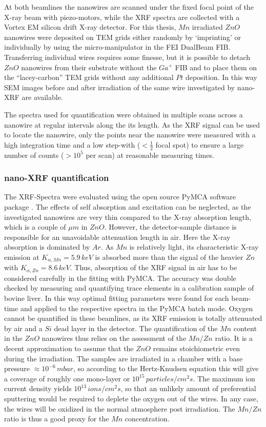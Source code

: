 At both beamlines the nanowires are scanned under the fixed focal point of the X-ray beam with piezo-motors, while the XRF spectra are collected with a Vortex EM silicon drift X-ray detector. For this thesis, $Mn$ irradiated $ZnO$ nanowires were deposited on TEM grids either randomly by `imprinting' or individually by using the micro-manipulator in the FEI DualBeam FIB. Transferring individual wires requires some finesse, but it is possible to detach $ZnO$ nanowires from their substrate without the $Ga^+$ FIB and to place them on the ``lacey-carbon'' TEM grids without any additional $Pt$ deposition. In this way SEM images before and after irradiation of the same wire investigated by nano-XRF are available.

The spectra used for quantification were obtained in multiple scans across a nanowire at regular intervals along the its length. As the XRF signal can be used to locate the nanowire, only the points near the nanowire were measured with a high integration time and a low step-with ($< \frac{1}{2}$ focal spot) to ensure a large number of counts ($> 10^5$ per scan) at reasonable measuring times.

\subsubsection{nano-XRF quantification}

The XRF-Spectra were evaluated using the open source PyMCA software package \cite{sole_multiplatform_2007}. The effects of self absorption and excitation can be neglected, as the investigated nanowires are very thin compared to the X-ray absorption length, which is a couple of $\mu m$ in $ZnO$. However, the detector-sample distance is responsible for an unavoidable attenuation length in air. Here the X-ray absorption is dominated by $Ar$. As $Mn$ is relatively light, its characteristic X-ray emission at $K_{\alpha,Mn} = 5.9\,keV$ is absorbed more than the signal of the heavier $Zn$ with $K_{\alpha,Zn} = 8.6\,keV$. Thus, absorption of the XRF signal in air has to be considered carefully in the fitting with PyMCA. The accuracy was double checked by measuring and quantifying trace elements in a calibration sample of bovine liver. In this way optimal fitting parameters were found for each beam-time and applied to the respective spectra in the PyMCA batch mode. Oxygen cannot be quantified in these beamlines, as its XRF emission is totally attenuated by air and a $Si$ dead layer in the detector. The quantification of the $Mn$ content in the $ZnO$ nanowires thus relies on the assessment of the $Mn/Zn$ ratio. It is a decent approximation to assume that the $ZnO$ remains stoichiometric even during the irradiation. The samples are irradiated in a chamber with a base pressure $\approx 10^{-6}\,mbar$, so according to the Hertz-Knudsen equation this will give a coverage of roughly one mono-layer or $10^{15}\,particles/cm^2s$. The maximum ion current density yields $10^{13}\,ions/cm^2s$, so that an unlikely amount of preferential sputtering would be required to deplete the oxygen out of the wires. In any case, the wires will be oxidized in the normal atmosphere post irradiation. The $Mn/Zn$ ratio is thus a good proxy for the $Mn$ concentration.

